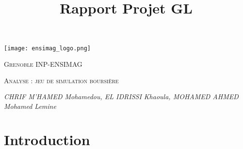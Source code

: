 \documentclass[10pt]{article}
\title{Rapport Projet GL}
\date{}
\author{}
\begin{document}
\large
\begin{titlepage}
    \centering
    \begin{minipage}{0.5\textwidth}

        \centering
        \texttt{[image: ensimag\_logo.png]}

    \end{minipage}%

    
    {\scshape\LARGE Grenoble INP-ENSIMAG  \par}
    \vspace{4cm}
    {\scshape\Large  Analyse :  jeu de simulation boursière \par}
    \vspace{8cm}
    {\Large\itshape CHRIF M'HAMED Mohamedou, EL IDRISSI Khaoula, MOHAMED AHMED Mohamed Lemine
\par}


\end{titlepage}

\tableofcontents

\newpage
\section{\textbf{Introduction}}
\end{document}
